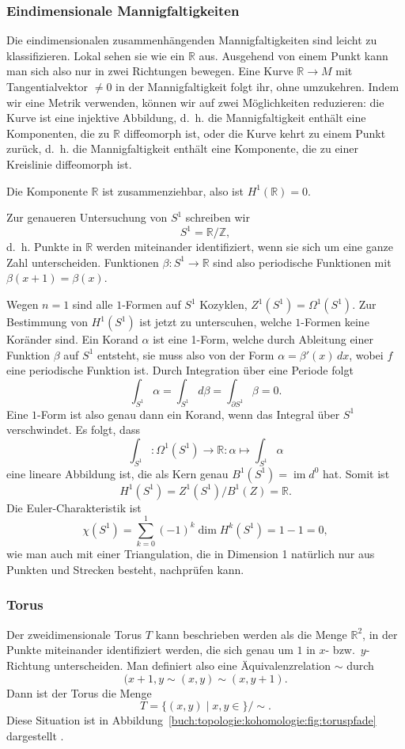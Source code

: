 %
%
\subsubsection{Eindimensionale Mannigfaltigkeiten}
Die eindimensionalen zusammenhängenden Mannigfaltigkeiten sind leicht
zu klassifizieren.
Lokal sehen sie wie ein $\mathbb{R}$ aus.
Ausgehend von einem Punkt kann man sich also nur in zwei Richtungen
bewegen.
Eine Kurve $\mathbb{R}\to M$ mit Tangentialvektor $\ne 0$ in der
Mannigfaltigkeit folgt ihr, ohne umzukehren.
Indem wir eine Metrik verwenden, können wir auf zwei Möglichkeiten
reduzieren: die Kurve ist eine injektive Abbildung, d.~h. die Mannigfaltigkeit
enthält eine Komponenten, die zu $\mathbb{R}$ diffeomorph ist,
oder die Kurve kehrt zu einem Punkt zurück, d.~h. die Mannigfaltigkeit
enthält eine Komponente, die zu einer Kreislinie diffeomorph ist.

Die Komponente $\mathbb{R}$ ist zusammenziehbar, also ist $H^1(\mathbb{R})=0$.

Zur genaueren Untersuchung von $S^1$ schreiben wir 
\[
S^1
=
\mathbb{R}/\mathbb{Z},
\]
d.~h. Punkte in $\mathbb{R}$ werden miteinander identifiziert, wenn
sie sich um eine ganze Zahl unterscheiden.
Funktionen $\beta\colon S^1\to\mathbb{R}$ sind also periodische Funktionen 
mit $\beta(x+1)=\beta(x)$.

Wegen $n=1$ sind
alle $1$-Formen auf $S^1$ Kozyklen, $Z^1(S^1)=\Omega^1(S^1)$.
Zur Bestimmung von $H^1(S^1)$ ist jetzt zu unterscuhen,
welche $1$-Formen keine Koränder sind.
Ein Korand $\alpha$ ist eine 1-Form, welche durch Ableitung einer
Funktion $\beta$ auf $S^1$ entsteht, sie muss also von der Form
$\alpha=\beta'(x)\,dx$, wobei $f$ eine periodische Funktion ist.
Durch Integration über eine Periode folgt
\[
\int_{S^1} \alpha
=
\int_{S^1} d\beta
=
\int_{\partial S^1} \beta
=
0.
\]
Eine $1$-Form ist also genau dann ein Korand, wenn das Integral
über $S^1$ verschwindet.
Es folgt, dass
\[
\int_{S^1}
\colon
\Omega^1(S^1)\to \mathbb{R}
:
\alpha
\mapsto
\int_{S^1}\alpha
\]
eine lineare Abbildung ist, die als Kern genau
$B^1(S^1)=\operatorname{im}d^0$ hat.
Somit ist
\[
H^1(S^1)
=
Z^1(S^1) / B^1(Z)
=
\mathbb{R}.
\]
Die Euler-Charakteristik ist
\[
\chi(S^1)
=
\sum_{k=0}^1 (-1)^k\dim H^k(S^1)
=
1-1
=
0,
\]
wie man auch mit einer Triangulation, die in Dimension 1 natürlich nur
aus Punkten und Strecken besteht, nachprüfen kann.

%
%
\subsubsection{Torus}

Der zweidimensionale Torus $T$ kann beschrieben werden als die
Menge $\mathbb{R}^2$, in der Punkte miteinander identifiziert
werden, die sich genau um $1$ in $x$- bzw.~$y$-Richtung unterscheiden.
Man definiert also eine Äquivalenzrelation $\sim$ durch
\[
(x+1,y \sim (x,y) \sim (x,y+1).
\]
Dann ist der Torus die Menge
\[
T
=
\{ (x,y) \mid x,y\in\mathbb\}
/
\sim.
\]
Diese Situation ist in
Abbildung~\ref{buch:topologie:kohomologie:fig:toruspfade}
dargestellt .


